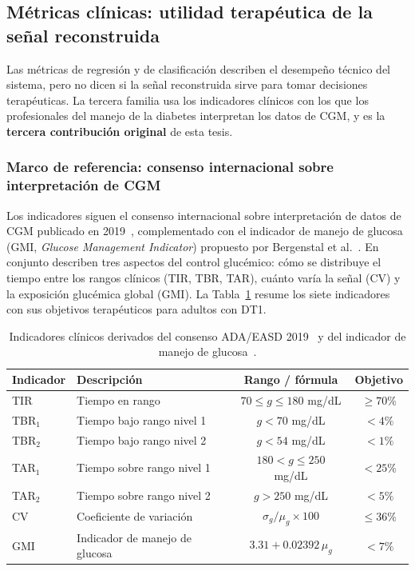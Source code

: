 \documentclass{report}
\begin{document}
\subsection{Métricas clínicas: utilidad terapéutica de la señal reconstruida}
\label{subsec:metricas_clinicas}

Las métricas de regresión y de clasificación describen el desempeño técnico del sistema, pero no dicen si la señal reconstruida sirve para tomar decisiones terapéuticas. La tercera familia usa los indicadores clínicos con los que los profesionales del manejo de la diabetes interpretan los datos de CGM, y es la \textbf{tercera contribución original} de esta tesis.

\subsubsection{Marco de referencia: consenso internacional sobre interpretación de CGM}

Los indicadores siguen el consenso internacional sobre interpretación de datos de CGM publicado en 2019~\cite{battelino2019}, complementado con el indicador de manejo de glucosa (GMI, \textit{Glucose Management Indicator}) propuesto por Bergenstal et al.~\cite{bergenstal2018}. En conjunto describen tres aspectos del control glucémico: cómo se distribuye el tiempo entre los rangos clínicos (TIR, TBR, TAR), cuánto varía la señal (CV) y la exposición glucémica global (GMI). La Tabla~\ref{tab:rangos_clinicos} resume los siete indicadores con sus objetivos terapéuticos para adultos con DT1.

\begin{table}[h]
    \centering
    \caption{Indicadores clínicos derivados del consenso ADA/EASD 2019~\cite{battelino2019} y del indicador de manejo de glucosa~\cite{bergenstal2018}.}
    \label{tab:rangos_clinicos}
    \begin{tabular}{llcc}
        \toprule
        \textbf{Indicador} & \textbf{Descripción} & \textbf{Rango / fórmula} & \textbf{Objetivo} \\
        \midrule
        TIR     & Tiempo en rango              & $70 \leq g \leq 180$ mg/dL & $\geq 70\%$ \\ 
        TBR$_1$ & Tiempo bajo rango nivel 1    & $g < 70$ mg/dL             & $< 4\%$ \\
        TBR$_2$ & Tiempo bajo rango nivel 2    & $g < 54$ mg/dL             & $< 1\%$ \\
        TAR$_1$ & Tiempo sobre rango nivel 1   & $180 < g \leq 250$ mg/dL   & $< 25\%$ \\
        TAR$_2$ & Tiempo sobre rango nivel 2   & $g > 250$ mg/dL            & $< 5\%$ \\
        CV      & Coeficiente de variación     & $\sigma_g / \mu_g \times 100$ & $\leq 36\%$ \\
        GMI     & Indicador de manejo de glucosa & $3.31 + 0.02392\, \mu_g$   & $< 7\%$ \\
        \bottomrule
    \end{tabular}
\end{table}
\end{document}

